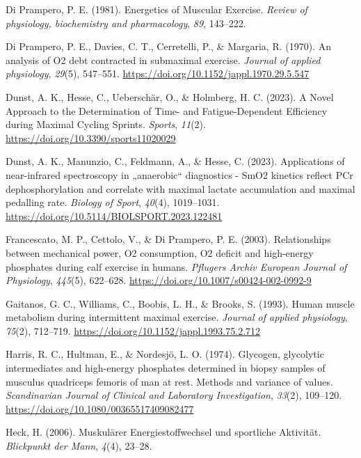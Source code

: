 \documentclass[
  letterpaper,
  DIV=11]{scrartcl}
\newlength{\cslhangindent}
\newenvironment{CSLReferences}[2] %
 {\begin{list}{}{%
  \setlength{\itemindent}{0pt}
  \setlength{\leftmargin}{0pt}
  \setlength{\parsep}{0pt}
  \ifodd #1
   \setlength{\leftmargin}{\cslhangindent}
   \setlength{\itemindent}{-1\cslhangindent}
  \fi
  \setlength{\itemsep}{#2\baselineskip}}}
 {\end{list}}
\begin{document}
\begin{CSLReferences}{1}{0}
Di Prampero, P. E. (1981). {Energetics of Muscular Exercise}.
\emph{Review of physiology, biochemistry and pharmacology}, \emph{89},
143--222.

Di Prampero, P. E., Davies, C. T., Cerretelli, P., \& Margaria, R.
(1970). {An analysis of O2 debt contracted in submaximal exercise.}
\emph{Journal of applied physiology}, \emph{29}(5), 547--551.
\url{https://doi.org/10.1152/jappl.1970.29.5.547}

Dunst, A. K., Hesse, C., Ueberschär, O., \& Holmberg, H. C. (2023). {A
Novel Approach to the Determination of Time- and Fatigue-Dependent
Efficiency during Maximal Cycling Sprints}. \emph{Sports}, \emph{11}(2).
\url{https://doi.org/10.3390/sports11020029}

Dunst, A. K., Manunzio, C., Feldmann, A., \& Hesse, C. (2023).
{Applications of near-infrared spectroscopy in {„anaerobic``}
diagnostics - SmO2 kinetics reflect PCr dephosphorylation and correlate
with maximal lactate accumulation and maximal pedalling rate}.
\emph{Biology of Sport}, \emph{40}(4), 1019--1031.
\url{https://doi.org/10.5114/BIOLSPORT.2023.122481}

Francescato, M. P., Cettolo, V., \& Di Prampero, P. E. (2003).
{Relationships between mechanical power, O2 consumption, O2 deficit and
high-energy phosphates during calf exercise in humans}. \emph{Pflugers
Archiv European Journal of Physiology}, \emph{445}(5), 622--628.
\url{https://doi.org/10.1007/s00424-002-0992-9}

Gaitanos, G. C., Williams, C., Boobis, L. H., \& Brooks, S. (1993).
{Human muscle metabolism during intermittent maximal exercise.}
\emph{Journal of applied physiology}, \emph{75}(2), 712--719.
\url{https://doi.org/10.1152/jappl.1993.75.2.712}

Harris, R. C., Hultman, E., \& Nordesjö, L. O. (1974). {Glycogen,
glycolytic intermediates and high-energy phosphates determined in biopsy
samples of musculus quadriceps femoris of man at rest. Methods and
variance of values}. \emph{Scandinavian Journal of Clinical and
Laboratory Investigation}, \emph{33}(2), 109--120.
\url{https://doi.org/10.1080/00365517409082477}

Heck, H. (2006). {Muskul{ä}rer Energiestoffwechsel und sportliche
Aktivit{ä}t}. \emph{Blickpunkt der Mann}, \emph{4}(4), 23--28.


\end{CSLReferences}
\end{document}
